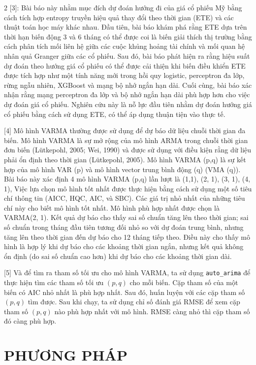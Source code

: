 \documentclass{article}
\begin{document}
\begin{multicols}{2}
[3]: Bài báo này nhằm mục đích dự đoán hướng đi của giá cổ phiếu Mỹ bằng cách tích hợp entropy truyền hiệu quả thay đổi theo thời gian (ETE) và các thuật toán học máy khác nhau. Đầu tiên, bài báo khám phá rằng ETE dựa trên thời hạn biến động 3 và 6 tháng có thể được coi là biến giải thích thị trường bằng cách phân tích mối liên hệ giữa các cuộc khủng hoảng tài chính và mối quan hệ nhân quả Granger giữa các cổ phiếu. Sau đó, bài báo phát hiện ra rằng hiệu suất dự đoán theo hướng giá cổ phiếu có thể được cải thiện khi biến điều khiển ETE được tích hợp như một tính năng mới trong hồi quy logistic, perceptron đa lớp, rừng ngẫu nhiên, XGBoost và mạng bộ nhớ ngắn hạn dài. Cuối cùng, bài báo xác nhận rằng mạng perceptron đa lớp và bộ nhớ ngắn hạn dài phù hợp hơn cho việc dự đoán giá cổ phiếu. Nghiên cứu này là nỗ lực đầu tiên nhằm dự đoán hướng giá cổ phiếu bằng cách sử dụng ETE, có thể áp dụng thuận tiện vào thực tế.

[4] Mô hình VARMA thường được sử dụng để dự báo dữ liệu chuỗi thời gian đa biến. Mô hình VARMA là sự mở rộng của mô hình ARMA trong chuỗi thời gian đơn biến (Lütkepohl, 2005; Wei, 1990) và được sử dụng với điều kiện rằng dữ liệu phải ổn định theo thời gian (Lütkepohl, 2005). Mô hình VARMA (p,q) là sự kết hợp của mô hình VAR (p) và mô hình vector trung bình động (q) (VMA (q)). Bài báo này xác định 4 mô hình VARMA (p,q) lần lượt là (1,1), (2, 1), (3, 1), (4, 1), Việc lựa chọn mô hình tốt nhất được thực hiện bằng cách sử dụng một số tiêu chí thông tin (AICC, HQC, AIC, và SBC). Các giá trị nhỏ nhất của những tiêu chí này cho biết mô hình tốt nhất. Mô hình phù hợp nhất được chọn là VARMA(2, 1). Kết quả dự báo cho thấy sai số chuẩn tăng lên theo thời gian; sai số chuẩn trong tháng đầu tiên tương đối nhỏ so với dự đoán trung bình, nhưng tăng lên theo thời gian đến dự báo cho 12 tháng tiếp theo. Điều này cho thấy mô hình là hợp lý khi dự báo cho các khoảng thời gian ngắn, nhưng kết quả không ổn định (do sai số chuẩn cao hơn) khi dự báo cho các khoảng thời gian dài.

[5] Và để tìm ra tham số tối ưu cho mô hình VARMA, ta sử dụng \texttt{auto\_arima} để thực hiện tìm các tham số tối ưu $(p, q)$ cho mỗi biến. Cặp tham số của một biến có AIC nhỏ nhất là phù hợp nhất. Sau đó, huấn luyện với các cặp tham số $(p, q)$ tìm được. Sau khi chạy, ta sử dụng chỉ số đánh giá RMSE để xem cặp tham số $(p, q)$ nào phù hợp nhất với mô hình. RMSE càng nhỏ thì cặp tham số đó càng phù hợp.


\section{PHƯƠNG PHÁP}


\end{multicols}
\end{document}
